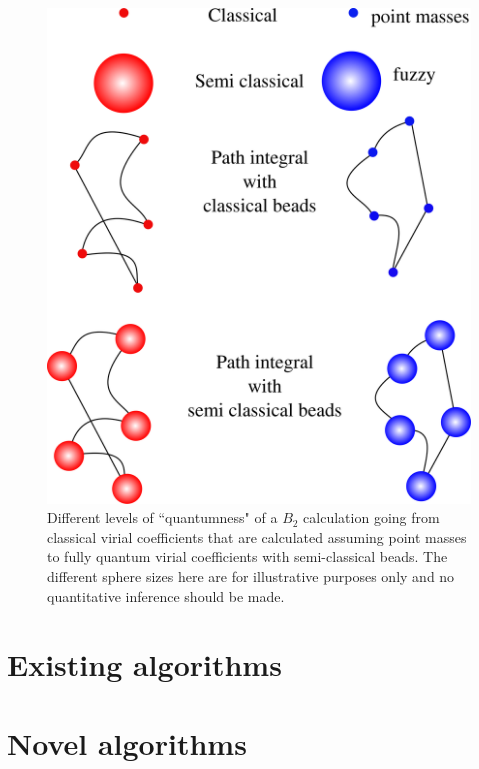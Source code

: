             \begin{figure}
                \centering
                \includegraphics[scale=0.087,keepaspectratio]{Chapter-2/Figures/quantumLevels.png}
                \caption{Different levels of ``quantumness" of a $B_2$ calculation going from classical virial coefficients that are calculated assuming point masses to fully quantum virial coefficients with semi-classical beads. The different sphere sizes here are for illustrative purposes only and no quantitative inference should be made.} \label{quantumness}
            \end{figure}
\section{Existing algorithms}
\section{Novel algorithms}
